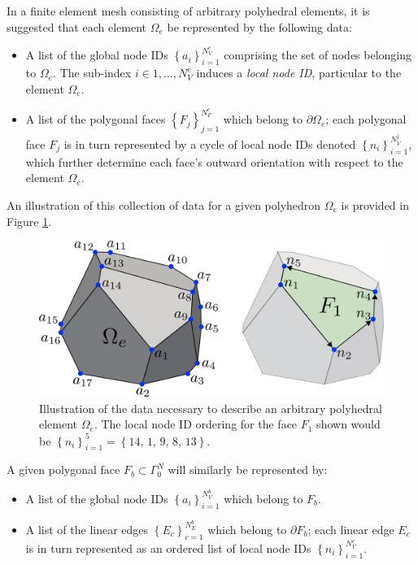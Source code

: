 	In a finite element mesh consisting of arbitrary polyhedral elements, it is suggested that each element $\Omega_e$ be represented by the following data:
	\begin{itemize}
		\item A list of the global node IDs $\left\{ a_i \right\}_{i=1}^{N^e_V}$ comprising the set of nodes belonging to $\Omega_e$. The sub-index $i \in 1, \ldots, N^e_V$ induces a \textit{local node ID}, particular to the element $\Omega_e$.
		\item A list of the polygonal faces $\left\{ F_{j} \right\}_{j=1}^{N^e_F}$ which belong to $\partial \Omega_e$; each polygonal face $F_j$ is in turn represented by a cycle of local node IDs denoted $\left\{ n_i \right\}_{i=1}^{N^j_V}$, which further determine each face's outward orientation with respect to the element $\Omega_e$.
	\end{itemize}
	An illustration of this collection of data for a given polyhedron $\Omega_e$ is provided in Figure \ref{fig:polyhedron_data}.
	\begin{figure} [!ht]
		\centering
		\includegraphics[width = 6.0in]{figures/polyhedron_data.pdf}
		\caption{Illustration of the data necessary to describe an arbitrary polyhedral element $\Omega_e$. The local node ID ordering for the face $F_1$ shown would be $\left\{ n_i \right\}_{i=1}^{5} = \left\{ 14, \, 1, \, 9, \, 8, \, 13 \right\}$.}
		\label{fig:polyhedron_data}
	\end{figure}
	
	A given polygonal face $F_b \subset \Gamma^N_0$ will similarly be represented by:
	\begin{itemize}
		\item A list of the global node IDs $\left\{ a_i \right\}_{i=1}^{N^b_V}$ which belong to $F_b$.
		\item A list of the linear edges $\left\{ E_{c} \right\}_{c=1}^{N^b_E}$ which belong to $\partial F_b$; each linear edge $E_c$ is in turn represented as an ordered list of local node IDs $\left\{ n_i \right\}_{i=1}^{N^c_V}$.
	\end{itemize}
	
